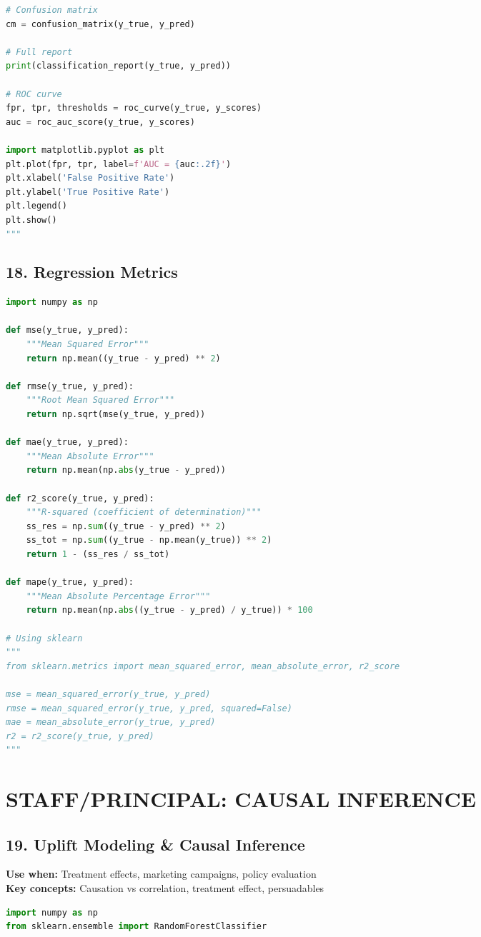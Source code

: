 \documentclass[8pt,landscape]{article}
\begin{document}
\begin{multicols}{3}
\begin{lstlisting}[language=Python]
# Confusion matrix
cm = confusion_matrix(y_true, y_pred)

# Full report
print(classification_report(y_true, y_pred))

# ROC curve
fpr, tpr, thresholds = roc_curve(y_true, y_scores)
auc = roc_auc_score(y_true, y_scores)

import matplotlib.pyplot as plt
plt.plot(fpr, tpr, label=f'AUC = {auc:.2f}')
plt.xlabel('False Positive Rate')
plt.ylabel('True Positive Rate')
plt.legend()
plt.show()
"""
\end{lstlisting}

\subsection*{18. Regression Metrics}
\begin{lstlisting}[language=Python]
import numpy as np

def mse(y_true, y_pred):
    """Mean Squared Error"""
    return np.mean((y_true - y_pred) ** 2)

def rmse(y_true, y_pred):
    """Root Mean Squared Error"""
    return np.sqrt(mse(y_true, y_pred))

def mae(y_true, y_pred):
    """Mean Absolute Error"""
    return np.mean(np.abs(y_true - y_pred))

def r2_score(y_true, y_pred):
    """R-squared (coefficient of determination)"""
    ss_res = np.sum((y_true - y_pred) ** 2)
    ss_tot = np.sum((y_true - np.mean(y_true)) ** 2)
    return 1 - (ss_res / ss_tot)

def mape(y_true, y_pred):
    """Mean Absolute Percentage Error"""
    return np.mean(np.abs((y_true - y_pred) / y_true)) * 100

# Using sklearn
"""
from sklearn.metrics import mean_squared_error, mean_absolute_error, r2_score

mse = mean_squared_error(y_true, y_pred)
rmse = mean_squared_error(y_true, y_pred, squared=False)
mae = mean_absolute_error(y_true, y_pred)
r2 = r2_score(y_true, y_pred)
"""
\end{lstlisting}

\section*{STAFF/PRINCIPAL: CAUSAL INFERENCE}

\subsection*{19. Uplift Modeling \& Causal Inference}
\textbf{Use when:} Treatment effects, marketing campaigns, policy evaluation \\
\textbf{Key concepts:} Causation vs correlation, treatment effect, persuadables
\begin{lstlisting}[language=Python]
import numpy as np
from sklearn.ensemble import RandomForestClassifier


\end{lstlisting}
\end{multicols}
\end{document}
